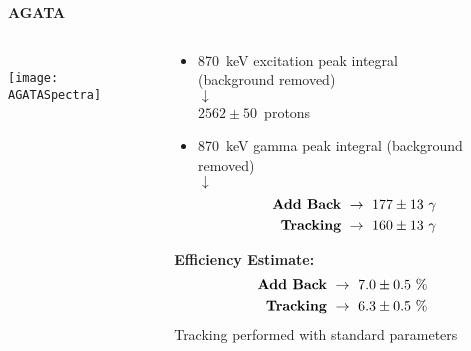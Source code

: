 \documentclass[10pt]{beamer}
\begin{document}
\begin{frame}
\centering
\vspace{0.02\textheight}
\textbf{\Large AGATA}
\vspace{0.01\textheight}
\begin{columns}
	\begin{column}{0.5\textwidth}
		\centering\\
		\vspace{-0.03\textheight}
		\texttt{[image: AGATASpectra]}\\
	\end{column}
	\begin{column}{0.5\textwidth}
		\begin{itemize}
    	    		\centering
			\item 870~keV excitation peak integral\\ (background removed)\\ $\downarrow$\\ $2562 \pm 50$~protons
			\item{870~keV gamma peak integral (background removed)\\
					$\downarrow$\\ 
					\vspace{-0.07\textheight}
					\begin{align*}
					\text{\textbf{Add Back}}\ &\rightarrow\ 177\pm 13\ \gamma\\
					\text{\textbf{Tracking}}\ &\rightarrow\ 160\pm 13\ \gamma
					\end{align*}
			  	}
		\end{itemize}
		\centering
		\textbf{Efficiency Estimate:}\\
		\vspace{-0.07\textheight}
		\begin{align*}
	  		\text{\textbf{Add Back}}\ &\rightarrow\ 7.0 \pm 0.5\ \%\\
	 		\text{\textbf{Tracking}}\ &\rightarrow\ 6.3 \pm 0.5\ \%
		\end{align*}
		\footnotesize Tracking performed with standard parameters
	\end{column}
\end{columns}
\end{frame}
\end{document}
